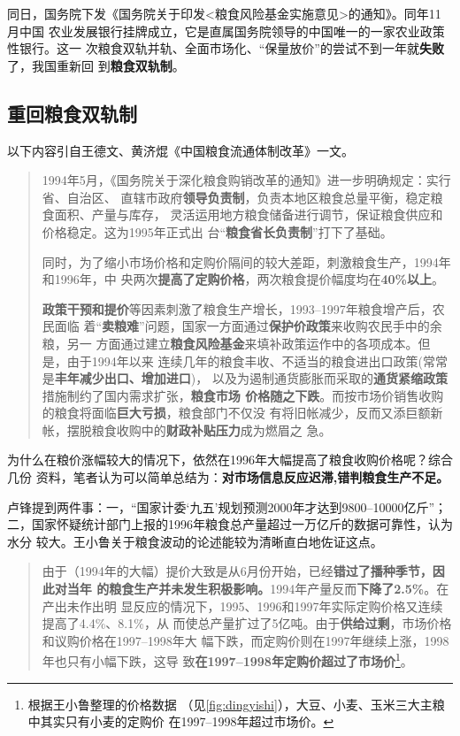 同日，国务院下发《国务院关于印发<粮食风险基金实施意见>的通知》。同年11月中国
农业发展银行挂牌成立，它是直属国务院领导的中国唯一的一家农业政策性银行。这一
次粮食双轨并轨、全面市场化、“保量放价”的尝试不到一年就\textbf{失败}了，我国重新回
到\textbf{粮食双轨制}。


\subsection{重回粮食双轨制}

以下内容引自王德文、黄济焜《中国粮食流通体制改革》一文。
\begin{quotation}
  1994年5月，《国务院关于深化粮食购销改革的通知》进一步明确规定：实行省、自治区、
  直辖市政府\textbf{领导负责制}，负责本地区粮食总量平衡，稳定粮食面积、产量与库存，
  灵活运用地方粮食储备进行调节，保证粮食供应和价格稳定。这为1995年正式出
  台“\textbf{粮食省长负责制}”打下了基础。

  同时，为了缩小市场价格和定购价隔间的较大差距，刺激粮食生产，1994年和1996年，中
  央两次\textbf{提高了定购价格}，两次粮食提价幅度均在\textbf{40\%以上}。

  \textbf{政策干预和提价}等因素刺激了粮食生产增长，1993--1997年粮食增产后，农民面临
  着“\textbf{卖粮难}”问题，国家一方面通过\textbf{保护价政策}来收购农民手中的余粮，另一
  方面通过建立\textbf{粮食风险基金}来填补政策运作中的各项成本。但是，由于1994年以来
  连续几年的粮食丰收、不适当的粮食进出口政策(常常是\textbf{丰年减少出口、增加进口})，
  以及为遏制通货膨胀而采取的\textbf{通货紧缩政策}措施制约了国内需求扩张，\textbf{粮食市场
    价格随之下跌}。而按市场价销售收购的粮食将面临\textbf{巨大亏损}，粮食部门不仅没
  有将旧帐减少，反而又添巨额新帐，摆脱粮食收购中的\textbf{财政补贴压力}成为燃眉之
  急。
\end{quotation}

为什么在粮价涨幅较大的情况下，依然在1996年大幅提高了粮食收购价格呢？综合几份
资料，笔者认为可以简单总结为：\textbf{对市场信息反应迟滞,错判粮食生产不足。}

卢锋提到两件事：一，“国家计委‘九五’规划预测2000年才达到9800--10000亿斤”；
二，国家怀疑统计部门上报的1996年粮食总产量超过一万亿斤的数据可靠性，认为水分
较大。王小鲁关于粮食波动的论述能较为清晰直白地佐证这点。
\begin{quotation}
  由于（1994年的大幅）提价大致是从6月份开始，已经\textbf{错过了播种季节，因此对当年
    的粮食生产并未发生积极影响。}1994年产量反而\textbf{下降了2.5\%}。在产出未作出明
  显反应的情况下，1995、1996和1997年实际定购价格又连续提高了4.4\%、8.1\%，从
  而使总产量扩过了5亿吨。由于\textbf{供给过剩}，市场价格和议购价格在1997--1998年大
  幅下跌，而定购价则在1997年继续上涨，1998年也只有小幅下跌，这导
  致\textbf{在1997--1998年定购价超过了市场价}\footnote{根据王小鲁整理的价格数据
    （见\cref{fig:dingyishi}），大豆、小麦、玉米三大主粮中其实只有小麦的定购价
    在1997--1998年超过市场价。}。\cite{wangxiaoluliangshi}
\end{quotation}


